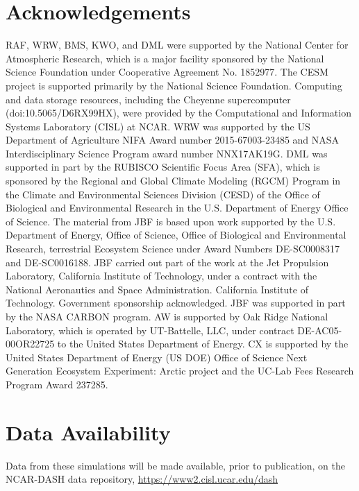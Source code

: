 \usepackage{}\documentclass[draft,linenumbers]{agujournal}
\begin{document}
\section{Acknowledgements}
RAF, WRW, BMS, KWO, and DML were supported by the National Center for Atmospheric Research, which is a major facility sponsored by the National Science Foundation under Cooperative Agreement No. 1852977. The CESM project is supported primarily by the National Science Foundation.  Computing and data storage resources, including the Cheyenne supercomputer (doi:10.5065/D6RX99HX), were provided by the Computational and Information Systems Laboratory (CISL) at NCAR. WRW was supported by the US Department of Agriculture NIFA Award number 2015-67003-23485 and NASA Interdisciplinary Science Program award number NNX17AK19G. DML was supported in part by the RUBISCO Scientific Focus Area (SFA), which is sponsored by the Regional and Global Climate Modeling (RGCM) Program in the Climate and Environmental Sciences Division (CESD) of the Office of Biological and Environmental Research in the U.S. Department of Energy Office of Science. The material from JBF is based upon work supported by the U.S. Department of Energy, Office of Science, Office of Biological and Environmental Research, terrestrial Ecosystem Science under Award Numbers DE-SC0008317 and DE-SC0016188. JBF carried out part of the work at the Jet Propulsion Laboratory, California Institute of Technology, under a contract with the National Aeronautics and Space Administration. California Institute of Technology. Government sponsorship acknowledged. JBF was supported in part by the NASA CARBON program. AW is supported by Oak Ridge National Laboratory, which is operated by UT-Battelle, LLC, under contract DE-AC05-00OR22725 to the United States Department of Energy. CX is supported by the United States Department of Energy (US DOE) Office of Science Next Generation Ecosystem Experiment: Arctic project and the UC-Lab Fees Research Program Award 237285.

\section{Data Availability}
Data from these simulations will be made available, prior to publication, on the NCAR-DASH data repository, \url{https://www2.cisl.ucar.edu/dash}

\nocite{*}

\clearpage
\end{document}
